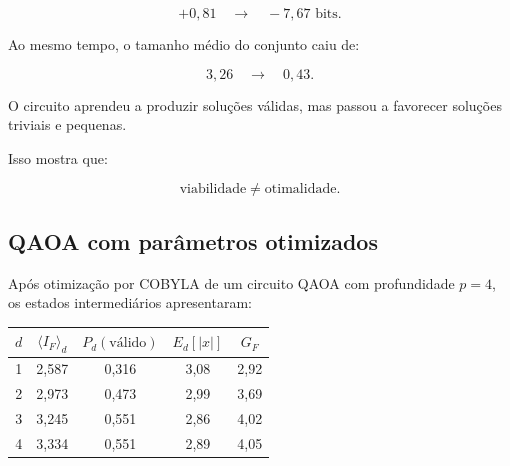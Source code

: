 \documentclass[11pt,a4paper]{article}
\begin{document}
\[
+0{,}81
\quad\longrightarrow\quad
-7{,}67
\text{ bits}.
\]

Ao mesmo tempo, o tamanho médio do conjunto caiu de:

\[
3{,}26
\quad\longrightarrow\quad
0{,}43.
\]

\begin{warningbox}[Interpretação]

O circuito aprendeu a produzir soluções válidas,
mas passou a favorecer soluções triviais e pequenas.

Isso mostra que:

\[
\text{viabilidade}
\neq
\text{otimalidade}.
\]

\end{warningbox}

\subsection{QAOA com parâmetros otimizados}

Após otimização por COBYLA de um circuito QAOA com profundidade $p=4$,
os estados intermediários apresentaram:

\begin{center}

\small

\renewcommand{\arraystretch}{1.35}

\begin{tabular}{ccccc}

\toprule

$d$
&
$\langle I_F\rangle_d$
&
$P_d(\mathrm{válido})$
&
$E_d[|x|]$
&
$G_F$
\\

\midrule

1 & 2{,}587 & 0{,}316 & 3{,}08 & 2{,}92 \\

2 & 2{,}973 & 0{,}473 & 2{,}99 & 3{,}69 \\

3 & 3{,}245 & 0{,}551 & 2{,}86 & 4{,}02 \\

4 & 3{,}334 & 0{,}551 & 2{,}89 & 4{,}05 \\

\bottomrule

\end{tabular}

\end{center}
\end{document}
